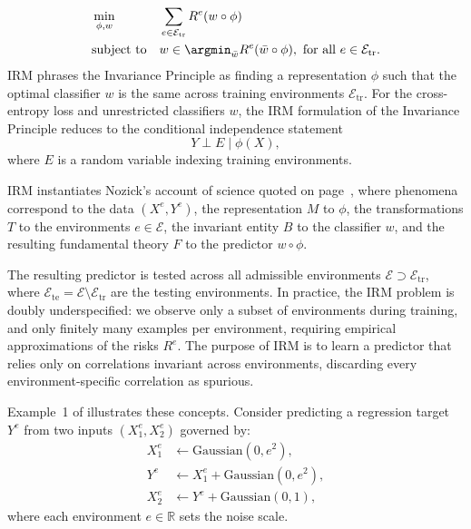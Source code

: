 \begin{equation*}
\begin{aligned}
    &\min_{\phi, w} & & \sum_{e \in \mathcal{E}_\text{tr}} R^e(w \circ \phi) \\
    &\text{subject to} & & w \in \argmin_{\bar w} R^e(\bar w \circ \phi), \text{ for all $e \in \mathcal{E}_\text{tr}$}.
\end{aligned}
\end{equation*}
IRM phrases the Invariance Principle as finding a representation $\phi$ such that the optimal classifier $w$ is the same across training environments $\mathcal{E}_\text{tr}$. 
For the cross-entropy loss and unrestricted classifiers $w$, the IRM formulation of the Invariance Principle reduces to the conditional independence statement
\begin{equation*}
  Y \perp E \mid \phi(X),
\end{equation*}
where $E$ is a random variable indexing training environments.

IRM instantiates Nozick's account of science quoted on page~\pageref{quote:science}, where phenomena correspond to the data $(X^e, Y^e)$, the representation $M$ to $\phi$, the transformations $T$ to the environments $e \in \mathcal{E}$, the invariant entity $B$ to the classifier $w$, and the resulting fundamental theory $F$ to the predictor $w \circ \phi$.

The resulting predictor is tested across all admissible environments $\mathcal{E} \supset \mathcal{E}_\text{tr}$, where $\mathcal{E}_\text{te} = \mathcal{E} \setminus \mathcal{E}_\text{tr}$ are the testing environments. In practice, the IRM problem is doubly underspecified: we observe only a subset of environments during training, and only finitely many examples per environment, requiring empirical approximations of the risks $R^e$. The purpose of IRM is to learn a predictor that relies only on correlations invariant across environments, discarding every environment-specific correlation as spurious.

Example~1 of \citet{arjovsky2019} illustrates these concepts. Consider predicting a regression target $Y^e$ from two inputs $(X^e_1, X^e_2)$ governed by:
\begin{align*}
    X^e_1 &\leftarrow \mathrm{Gaussian}(0, e^2), \\
    Y^e   &\leftarrow X^e_1 + \mathrm{Gaussian}(0, e^2), \\
    X^e_2 &\leftarrow Y^e + \mathrm{Gaussian}(0, 1),
\end{align*}
where each environment $e \in \mathbb{R}$ sets the noise scale.

